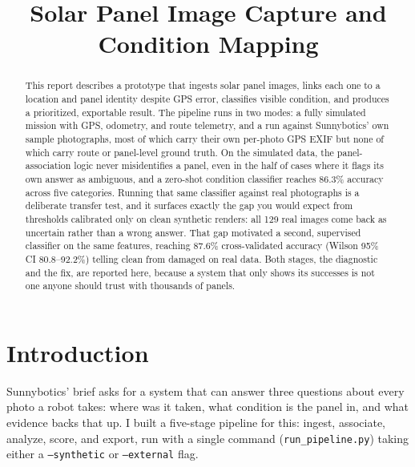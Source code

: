 \documentclass[10pt,conference]{IEEEtran}
\begin{document}
\footnotesize

\title{Solar Panel Image Capture and Condition Mapping}
\author{
}

\maketitle

\begin{abstract}
This report describes a prototype that ingests solar panel images, links each one to a location and panel identity despite GPS error, classifies visible condition, and produces a prioritized, exportable result. The pipeline runs in two modes: a fully simulated mission with GPS, odometry, and route telemetry, and a run against Sunnybotics' own sample photographs, most of which carry their own per-photo GPS EXIF but none of which carry route or panel-level ground truth. On the simulated data, the panel-association logic never misidentifies a panel, even in the half of cases where it flags its own answer as ambiguous, and a zero-shot condition classifier reaches 86.3\% accuracy across five categories. Running that same classifier against real photographs is a deliberate transfer test, and it surfaces exactly the gap you would expect from thresholds calibrated only on clean synthetic renders: all 129 real images come back as uncertain rather than a wrong answer. That gap motivated a second, supervised classifier on the same features, reaching 87.6\% cross-validated accuracy (Wilson 95\% CI 80.8--92.2\%) telling clean from damaged on real data. Both stages, the diagnostic and the fix, are reported here, because a system that only shows its successes is not one anyone should trust with thousands of panels.
\end{abstract}

\section{Introduction}
Sunnybotics' brief asks for a system that can answer three questions about every photo a robot takes: where was it taken, what condition is the panel in, and what evidence backs that up. I built a five-stage pipeline for this: ingest, associate, analyze, score, and export, run with a single command (\texttt{run\_pipeline.py}) taking either a \texttt{--synthetic} or \texttt{--external} flag.
\end{document}
